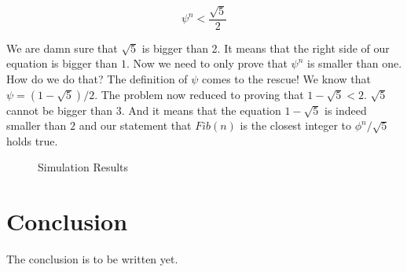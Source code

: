 \documentclass{article}
\begin{document}
\begin{equation}
	\psi^n < \frac {\sqrt5} {2}
\end{equation}

We are damn sure that $\sqrt5$ is bigger than 2. It means that the right side of our equation is bigger than $1$. Now we need to only prove that $\psi^n$ is smaller than one. How do we do that? The definition of $\psi$ comes to the rescue! We know that $\psi=(1-\sqrt5) / 2$. The problem now reduced to proving that $1 - \sqrt5 < 2$. $\sqrt5$ cannot be bigger than $3$. And it means that the equation $1 - \sqrt5$ is indeed smaller than $2$ and our statement that $Fib(n)$ is the closest integer to $\phi^n / \sqrt5$ holds true.

\begin{figure}
    \centering
    \caption{Simulation Results}
    \label{simulationfigure}
\end{figure}

\section{Conclusion}
The conclusion is to be written yet.
\end{document}
